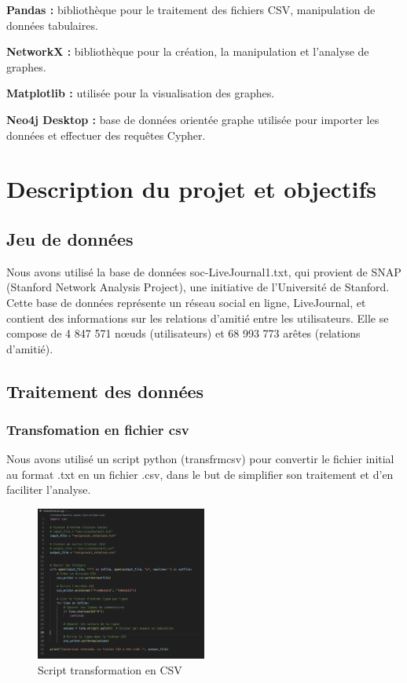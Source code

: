 \documentclass[a4paper, 12pt, twoside]{article}
\begin{document}
\textbf{Pandas :} bibliothèque pour le traitement des fichiers CSV, manipulation de données tabulaires.

\textbf{NetworkX :} bibliothèque pour la création, la manipulation et l’analyse de graphes.

\textbf{Matplotlib :} utilisée pour la visualisation des graphes.

\textbf{Neo4j Desktop :} base de données orientée graphe utilisée pour importer les données et effectuer des requêtes Cypher.

\section{Description du projet et objectifs}
	\subsection{Jeu de données}
    Nous avons utilisé la base de données soc-LiveJournal1.txt, qui provient de SNAP (Stanford Network Analysis Project), une initiative de l'Université de Stanford. Cette base de données représente un réseau social en ligne, LiveJournal, et contient des informations sur les relations d'amitié entre les utilisateurs. Elle se compose de 4 847 571 nœuds (utilisateurs) et 68 993 773 arêtes (relations d'amitié).
    
	\subsection{Traitement des données}
    \subsubsection{Transfomation en fichier csv}
    Nous avons utilisé un script python (transfrmcsv) pour convertir le fichier initial au format .txt en un fichier .csv, dans le but de simplifier son traitement et d’en faciliter l’analyse.
    
    
      \begin{figure}[h]
        \centering
        \includegraphics[width=0.5\textwidth]{transfrmcsv.png}
        \caption{Script transformation en CSV}
        \label{fig:label_image}
      \end{figure}
\end{document}
